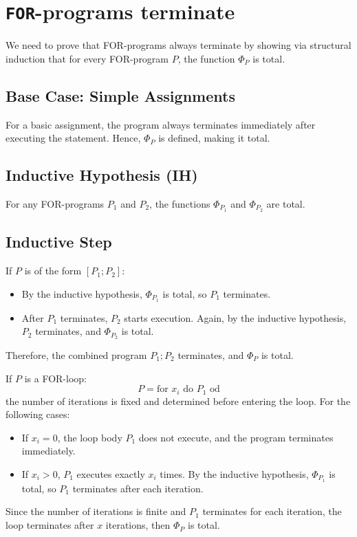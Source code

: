 


\setcounter{section}{1}
\section{\lstinline|FOR|-programs terminate}


We need to prove that FOR-programs always terminate by showing via structural induction that for every FOR-program \( P \), the function \( \Phi_P \) is total.

\subsection*{Base Case: Simple Assignments}
For a basic assignment, the program always terminates immediately after executing the statement. Hence, \( \Phi_P \) is defined, making it total.

\subsection*{Inductive Hypothesis (IH)}
For any FOR-programs \( P_1 \) and \( P_2 \), the functions \( \Phi_{P_1} \) and \( \Phi_{P_2} \) are total. 
\subsection*{Inductive Step}
If \( P \) is of the form \( [P_1; P_2] \):
\begin{itemize}
    \item By the inductive hypothesis, \( \Phi_{P_1} \) is total, so \( P_1 \) terminates.
    \item After \( P_1 \) terminates, \( P_2 \) starts execution. Again, by the inductive hypothesis, \( P_2 \) terminates, and \( \Phi_{P_2} \) is total.
\end{itemize}
Therefore, the combined program \( P_1; P_2 \) terminates, and \( \Phi_P \) is total.

If \( P \) is a FOR-loop:
\[
P = \text{for } x_i \text{ do } P_1 \text{ od}
\]
the number of iterations is fixed and determined before entering the loop. For the following cases:
\begin{itemize}
    \item If \( x_i = 0 \), the loop body \( P_1 \) does not execute, and the program terminates immediately.
    \item If \( x_i > 0 \), \( P_1 \) executes exactly \( x_i \) times. By the inductive hypothesis, \( \Phi_{P_1} \) is total, so \( P_1 \) terminates after each iteration.
\end{itemize}
Since the number of iterations is finite and \( P_1 \) terminates for each iteration, the loop terminates after \( x \) iterations, then \( \Phi_P \) is total.



